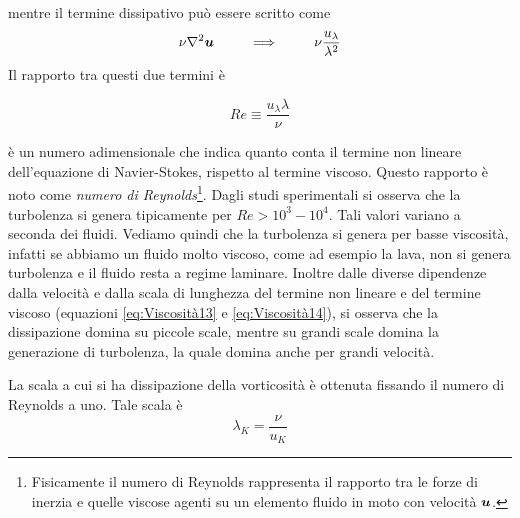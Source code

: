 mentre il termine dissipativo può essere scritto come
\begin{equation}
\nu \Grad^2 \V{u} \,\,\,\,\,\,\,\,\,\,\,\,\,\,\, \Longrightarrow \,\,\,\,\,\,\,\,\,\,\,\,\,\,\,\nu \dfrac{u_\lambda}{\lambda^2} \label{eq:Viscosità14}
\end{equation}
Il rapporto tra questi due termini è 
\begin{EQ}
\begin{equation}
Re \equiv \dfrac{u_\lambda \lambda}{\nu}
\end{equation}
\end{EQ}
è un numero adimensionale che indica quanto conta il termine non lineare dell'equazione di Navier-Stokes, rispetto al termine viscoso. Questo rapporto è noto come \textit{numero di Reynolds}\footnote{Fisicamente il numero di Reynolds rappresenta il rapporto tra le forze di inerzia e quelle viscose agenti su un elemento fluido in moto con velocità $\V{u}$.}. Dagli studi sperimentali si osserva che la turbolenza si genera tipicamente per $Re>10^3 - 10^4$. Tali valori variano a seconda dei fluidi. Vediamo quindi che la turbolenza si genera per basse viscosità, infatti se abbiamo un fluido molto viscoso, come ad esempio la lava, non si genera turbolenza e il fluido resta a regime laminare. Inoltre dalle diverse dipendenze dalla velocità e dalla scala di lunghezza del termine non lineare e del termine viscoso (equazioni \ref{eq:Viscosità13} e \ref{eq:Viscosità14}), si osserva che la dissipazione domina su piccole scale, mentre su grandi scale domina la generazione di turbolenza, la quale domina anche per grandi velocità.  

La scala a cui si ha dissipazione della vorticosità è ottenuta fissando il numero di Reynolds a uno. Tale scala è 
\begin{equation}
\lambda_K = \dfrac{\nu}{u_K} \label{eq:Viscosità16}
\end{equation}


